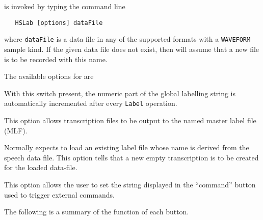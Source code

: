 

 is invoked by typing the command line
\begin{verbatim}
   HSLab [options] dataFile
\end{verbatim}
where \texttt{dataFile} is a data file in any of the supported formats with a 
\texttt{WAVEFORM} sample kind.   If the given data file does not exist, then
 will assume that a new file is to be recorded with this name.

The available options for  are

\begin{optlist}
   With this switch present, the numeric part of the global labelling
  string is automatically incremented after every \texttt{Label} operation.

   This option allows transcription files to be output to the
  named master label file (MLF). 

   Normally  expects to load an existing label file
  whose name is derived from the speech data file. This option tells 
   that a new empty transcription is to be created for the loaded 
  data-file.

   This option allows the user to set the string displayed
  in the ``command'' button used to trigger external commands.

\stdoptF
\stdoptG
\stdoptI
\stdoptL
\stdoptX
\end{optlist}

The following is a summary of the function of each 
button.

